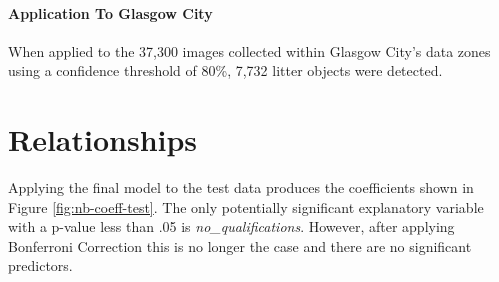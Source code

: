 \documentclass{thesis}
\begin{document}
\paragraph{Application To Glasgow City}

When applied to the 37,300 images collected within Glasgow City's data zones using a confidence threshold of 80\%, 7,732 litter objects were detected.



\newpage
\section{Relationships}

Applying the final model to the test data produces the coefficients shown in Figure \ref{fig:nb-coeff-test}. The only potentially significant explanatory variable with a p-value less than .05 is \textit{no\_qualifications}. However, after applying Bonferroni Correction this is no longer the case and there are no significant predictors.
\end{document}
